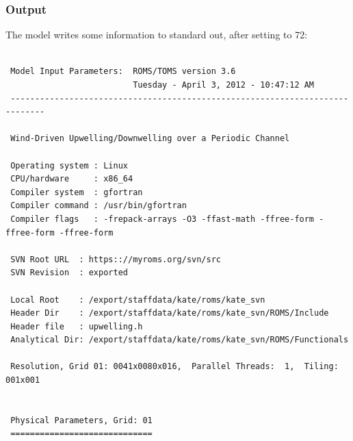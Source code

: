 \subsubsection{Output}
\label{Output}
The model writes some information to standard out, after setting
 to 72:
\begin{verbatim}

 Model Input Parameters:  ROMS/TOMS version 3.6  
                          Tuesday - April 3, 2012 - 10:47:12 AM
 -----------------------------------------------------------------------------

 Wind-Driven Upwelling/Downwelling over a Periodic Channel

 Operating system : Linux
 CPU/hardware     : x86_64
 Compiler system  : gfortran
 Compiler command : /usr/bin/gfortran
 Compiler flags   : -frepack-arrays -O3 -ffast-math -ffree-form -ffree-form -ffree-form

 SVN Root URL  : https:://myroms.org/svn/src
 SVN Revision  : exported

 Local Root    : /export/staffdata/kate/roms/kate_svn
 Header Dir    : /export/staffdata/kate/roms/kate_svn/ROMS/Include
 Header file   : upwelling.h
 Analytical Dir: /export/staffdata/kate/roms/kate_svn/ROMS/Functionals

 Resolution, Grid 01: 0041x0080x016,  Parallel Threads:  1,  Tiling: 001x001


 Physical Parameters, Grid: 01
 =============================


\end{verbatim}

